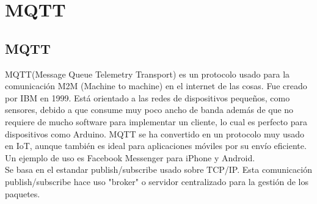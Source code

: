 \documentclass[12pt, twoside]{book}
\begin{document}
\chapter{MQTT}
\section{MQTT}
MQTT(Message Queue Telemetry Transport) es un protocolo usado para la comunicación M2M (Machine to machine) en el internet de las cosas. Fue creado por IBM en 1999. Está orientado a las redes de dispositivos pequeños, como sensores, debido a que consume muy poco ancho de banda además de que no requiere de mucho software para implementar un cliente, lo cual es perfecto para dispositivos como Arduino. MQTT se ha convertido en un protocolo muy usado en IoT, aunque también es ideal para aplicaciones móviles por su envío eficiente. Un ejemplo de uso es Facebook Messenger para iPhone y Android.\\
Se basa en el estandar publish/subscribe usado sobre TCP/IP. Esta comunicación publish/subscribe hace uso "broker" o servidor centralizado para la gestión de los paquetes.
\end{document}
